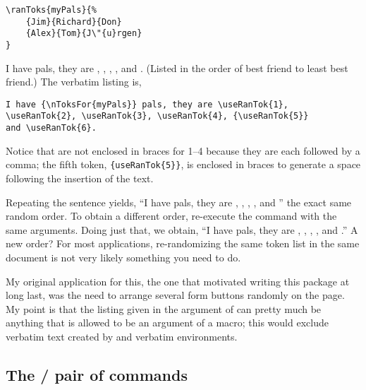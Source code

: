 \documentclass{article}
\begin{document}
\begin{Verbatim}[xleftmargin=20pt,commandchars=!()]
\ranToks{myPals}{%
    {Jim}{Richard}{Don}
    {Alex}{Tom}{J\"{u}rgen}
}
\end{Verbatim}
I have {} pals, they are , ,
, , {} and . (Listed
in the order of best friend to least best friend.)
The verbatim listing is,
\begin{Verbatim}[xleftmargin=20pt,commandchars=!()]
I have {\nToksFor{myPals}} pals, they are \useRanTok{1},
\useRanTok{2}, \useRanTok{3}, \useRanTok{4}, {\useRanTok{5}}
and \useRanTok{6}.
\end{Verbatim}
Notice that  are not enclosed in braces for 1--4 because
they are each followed by a comma; the fifth token, \verb!{useRanTok{5}}!, is
enclosed in braces to generate a space following the insertion of the text.

Repeating the sentence yields, ``I have {} pals, they are
, , , ,
{} and '' the exact same random order. To obtain
a different order, re-execute the  command with the same
arguments. Doing just that, we obtain, ``I have {} pals, they
are , , , ,
{} and .'' A new order? For most applications,
re-randomizing the same token list in the same document is not very likely
something you need to do.

My original application for this, the one that motivated writing this
package at long last, was the need to arrange several form buttons
randomly on the page. My point is that the listing given in the argument
of  can pretty much be anything that is allowed to be an
argument of a macro; this would exclude verbatim text created by 
and verbatim environments.

\subsection{The
\texorpdfstring{\protect{}/\protect{}}
    {/} pair of commands}
\end{document}
